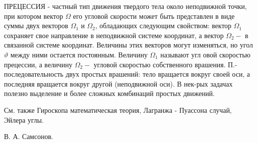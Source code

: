 \documentclass[10pt]{article}
\begin{document}
ПРЕЦЕССИЯ - частный тип движения твердого тела около неподвижной точки, при котором вектор $\Omega$ его угловой скорости может быть представлен в виде суммы двух векторов $\Omega_{1}$ и $\Omega_{2}$, обладающих следующим свойством: вектор $\Omega_{1}$ сохраняет свое направление в неподвижной системе координат, а вектор $\Omega_{2}-$ в связанной системе координат. Величины этих векторов могут изменяться, но угол $\vartheta$ между ними остается постоянным. Величину $\Omega_{1}$ называют угл овой скоростью прецессии, а величину $\Omega_{2}-$ угловой скоростью собственного врашения. П.- последовательность двух простых врашений: тело вращается вокруг своей оси, а последняя вращается вокруг другой (неподвижной оси). В нек-рых задачах полезно выделение и более сложных комбинаций простых движений.



См. также Гироскопа математическая теория, Лагранжа - Пуассона случай, Эйлера углы.



В. А. Самсонов.
\end{document}
